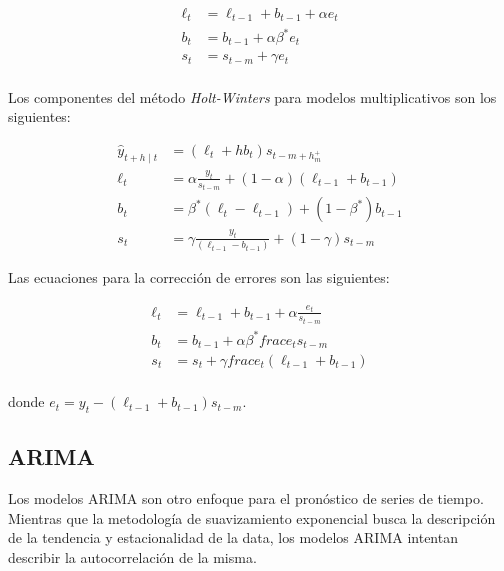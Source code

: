 \begin{equation}
\begin{split}
	\ell_{t} & = \ell_{t-1} + b_{t-1} + \alpha e_{t} \\
    b_{t} & = b_{t-1} + \alpha \beta^{*} e_{t} \\
    s_{t} & = s_{t-m} + \gamma e_{t} \\
\end{split}
\end{equation}

Los componentes del método \emph{Holt-Winters} para modelos multiplicativos son los siguientes:

\begin{equation}
\begin{split}
	\hat{y}_{t+h \mid t} & = (\ell_{t} + hb_{t}) s_{t-m+h_{m}^{+}} \\
 	\ell_{t} & = \alpha \frac{y_{t}}{s_{t-m}} + (1 - \alpha)(\ell_{t-1} + b_{t-1}) \\
    b_{t} & = \beta^{*}(\ell_{t} - \ell_{t-1}) + (1 - \beta^{*})b_{t-1} \\
    s_{t} & = \gamma \frac{y_{t}}{(\ell_{t-1} - b_{t-1})} + (1-\gamma)s_{t-m}
\end{split}
\end{equation}

Las ecuaciones para la corrección de errores son las siguientes:

\begin{equation}
\begin{split}
	\ell_{t} & = \ell_{t-1} + b_{t-1} + \alpha \frac{e_{t}}{s_{t-m}} \\
    b_{t} & = b_{t-1} + \alpha \beta^{*} frac{e_{t}}{s_{t-m}} \\
    s_{t} & = s_{t} + \gamma frac{e_{t}}{(\ell_{t-1} + b_{t-1})} \\
\end{split}
\end{equation}

donde $e_{t} = y_{t} - (\ell_{t-1} + b_{t-1})s_{t-m}$.

\subsection{ARIMA}
Los modelos ARIMA son otro enfoque para el pronóstico de series de tiempo. Mientras que la metodología de suavizamiento exponencial busca la descripción de la tendencia y estacionalidad de la data, los modelos ARIMA intentan describir la autocorrelación de la misma.

